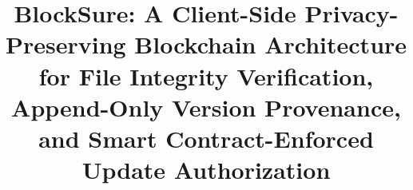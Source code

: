 \documentclass[10pt,conference,letterpaper]{IEEEtran}
\begin{document}
\title{BlockSure: A Client-Side Privacy-Preserving Blockchain Architecture for File Integrity Verification, Append-Only Version Provenance, and Smart Contract-Enforced Update Authorization}

\author{
}

\maketitle
\end{document}
